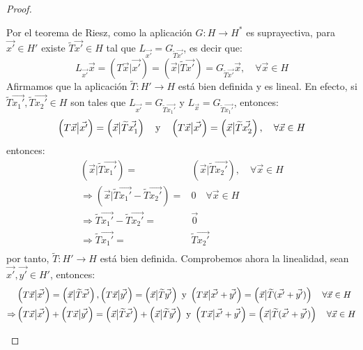 \documentclass[12pt]{report}
\theoremstyle{largebreak}
\newcommand\cf[3]{\ensuremath{#1:#2\rightarrow#3}}
\newcommand\adj[1]{\ensuremath{\widetilde{#1}}}
\newcommand\pint[2]{\ensuremath{\left(#1\big|#2\right)}}
\begin{document}
\begin{proof}
\begin{itemize}
            Por el teorema de Riesz, como la aplicación $\cf{G}{H}{H^*}$ es suprayectiva, para $\vec{x'}\in H'$ existe $\adj{T}\vec{x'}\in H$ tal que $L_{\vec{x'}}=G_{\adj{T}\vec{x'}}$, es decir que:
            \begin{equation*}
                L_{\vec{x'}}\vec{x}=\pint{T\vec{x}}{\vec{x'}}=\pint{\vec{x}}{\adj{T}\vec{x'}}=G_{\adj{T}\vec{x'}}\vec{x},\quad\forall\vec{x}\in H
            \end{equation*}
            Afirmamos que la aplicación $\cf{\adj{T}}{H'}{H}$ está bien definida y es lineal. En efecto, si $\adj{T}\vec{x_1'},\adj{T}\vec{x_2'}\in H$ son tales que $L_{\vec{x'}}=G_{\adj{T}\vec{x_1'}}$ y $L_{\vec{x}}=G_{\adj{T}\vec{x_1'}}$, entonces:
            \begin{equation*}
                \pint{T\vec{x}}{\vec{x'}}=\pint{\vec{x}}{\adj{T}\vec{x_1'}}\quad\textup{y}\quad\pint{T\vec{x}}{\vec{x'}}=\pint{\vec{x}}{\adj{T}\vec{x_2'}},\quad\forall\vec{x}\in H
            \end{equation*}
            entonces:
            \begin{equation*}
                \begin{split}
                    \pint{\vec{x}}{\adj{T}\vec{x_1'}}=&\pint{\vec{x}}{\adj{T}\vec{x_2'}},\quad\forall\vec{x}\in H\\
                    \Rightarrow \pint{\vec{x}}{\adj{T}\vec{x_1'}-\adj{T}\vec{x_2'}}=&0\quad\forall\vec{x}\in H\\
                    \Rightarrow\adj{T}\vec{x_1'}-\adj{T}\vec{x_2'}=&\vec{0}\\
                    \Rightarrow\adj{T}\vec{x_1'}=&\adj{T}\vec{x_2'}\\ 
                \end{split}
            \end{equation*}
            por tanto, $\cf{\adj{T}}{H'}{H}$ está bien definida. Comprobemos ahora la linealidad, sean $\vec{x'},\vec{y'}\in H'$, entonces:
            \begin{equation*}
                \begin{split}
                    &\pint{T\vec{x}}{\vec{x'}}=\pint{\vec{x}}{\adj{T}\vec{x'}},\pint{T\vec{x}}{\vec{y'}}=\pint{\vec{x}}{\adj{T}\vec{y'}}\textup{ y }\pint{T\vec{x}}{\vec{x'}+\vec{y'}}=\pint{\vec{x}}{\adj{T}(\vec{x'}+\vec{y'})}\quad\forall\vec{x}\in H\\
                    \Rightarrow& \pint{T\vec{x}}{\vec{x'}}+\pint{T\vec{x}}{\vec{y'}}=\pint{\vec{x}}{\adj{T}\vec{x'}}+\pint{\vec{x}}{\adj{T}\vec{y'}}\textup{ y }\pint{T\vec{x}}{\vec{x'}+\vec{y'}}=\pint{\vec{x}}{\adj{T}(\vec{x'}+\vec{y'})}\quad\forall\vec{x}\in H\\

\end{split}
\end{equation*}
\end{itemize}
\end{proof}
\end{document}
